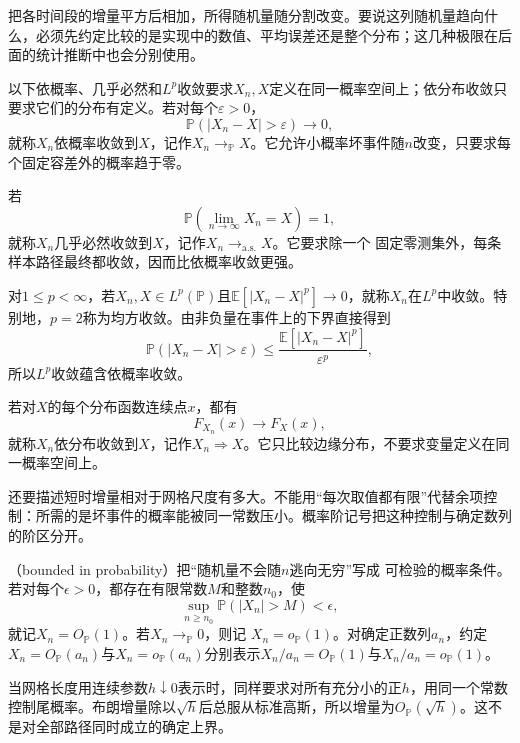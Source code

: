 把各时间段的增量平方后相加，所得随机量随分割改变。要说这列随机量趋向什么，必须先约定比较的是实现中的数值、平均误差还是整个分布；这几种极限在后面的统计推断中也会分别使用。
\begin{definition}[随机变量的收敛]
  \label{def:probability-random-convergence}
以下依概率、几乎必然和\(L^p\)收敛要求\(X_n,X\)定义在同一概率空间上；依分布收敛只要求它们的分布有定义。若对每个\(\varepsilon>0\)，
\[ \mathbb{P}(|X_n-X|>\varepsilon)\to0, \]
就称\(X_n\)依概率收敛到\(X\)，记作\(X_n\to_{\mathbb{P}}X\)。它允许小概率坏事件随\(n\)改变，只要求每个固定容差外的概率趋于零。

若
\[ \mathbb{P}\left(
    \lim_{n\to\infty}X_n=X\right)=1, \]
就称\(X_n\)几乎必然收敛到\(X\)，记作\(X_n\to_{\mathrm{a.s.}}X\)。它要求除一个
固定零测集外，每条样本路径最终都收敛，因而比依概率收敛更强。

对\(1\leq p<\infty\)，若\(X_n,X\in L^p(\mathbb P)\)且\(\mathbb{E}[|X_n-X|^p]\to0\)，就称\(X_n\)在\(L^p\)中收敛。特别地，\(p=2\)称为均方收敛。由非负量在事件上的下界直接得到
\[ \mathbb{P}(|X_n-X|>\varepsilon)
  \leq\frac{\mathbb{E}[|X_n-X|^p]}{\varepsilon^p}, \]
所以\(L^p\)收敛蕴含依概率收敛。

若对\(X\)的每个分布函数连续点\(x\)，都有
\[ F_{X_n}(x)\to F_X(x), \]
就称\(X_n\)依分布收敛到\(X\)，记作\(X_n\Rightarrow X\)。它只比较边缘分布，不要求变量定义在同一概率空间上。

\end{definition}

还要描述短时增量相对于网格尺度有多大。不能用“每次取值都有限”代替余项控制：所需的是坏事件的概率能被同一常数压小。概率阶记号把这种控制与确定数列的阶区分开。
\begin{definition}[概率阶记号]
  \label{def:statistics-probability-order}
（bounded in probability）把“随机量不会随\(n\)逃向无穷”写成
可检验的概率条件。若对每个\(\epsilon>0\)，都存在有限常数\(M\)和整数\(n_0\)，使
\[
  \sup_{n\geq n_0}\mathbb{P}(|X_n|>M)<\epsilon,
\]
就记\(X_n=O_{\mathbb{P}}(1)\)。若\(X_n\to_{\mathbb{P}}0\)，则记
\(X_n=o_{\mathbb{P}}(1)\)。对确定正数列\(a_n\)，约定\(X_n=O_{\mathbb P}(a_n)\)与\(X_n=o_{\mathbb P}(a_n)\)分别表示\(X_n/a_n=O_{\mathbb P}(1)\)与\(X_n/a_n=o_{\mathbb P}(1)\)。
\end{definition}
当网格长度用连续参数\(h\downarrow0\)表示时，同样要求对所有充分小的正\(h\)，用同一个常数控制尾概率。布朗增量除以\(\sqrt h\)后总服从标准高斯，所以增量为\(O_{\mathbb P}(\sqrt h)\)。这不是对全部路径同时成立的确定上界。

